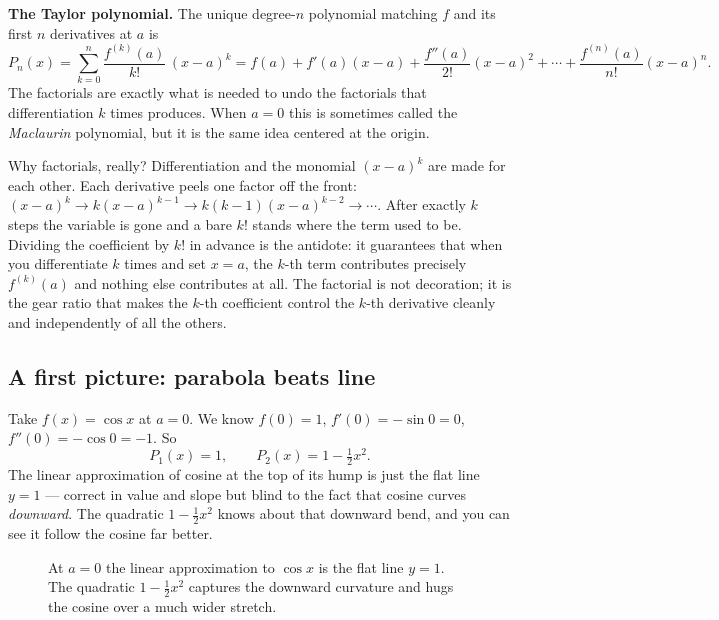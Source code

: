 \begin{focusbox}
\textbf{The Taylor polynomial.} The unique degree-$n$ polynomial matching $f$ and its
first $n$ derivatives at $a$ is
\[
  P_n(x) = \sum_{k=0}^{n} \frac{f^{(k)}(a)}{k!}\,(x-a)^k
  = f(a) + f'(a)(x-a) + \frac{f''(a)}{2!}(x-a)^2 + \cdots + \frac{f^{(n)}(a)}{n!}(x-a)^n.
\]
The factorials are exactly what is needed to undo the factorials that
differentiation $k$ times produces. When $a=0$ this is sometimes called the
\emph{Maclaurin} polynomial, but it is the same idea centered at the origin.
\end{focusbox}

\begin{whybox}
Why factorials, really? Differentiation and the monomial $(x-a)^k$ are made for each
other. Each derivative peels one factor off the front: $(x-a)^k \to k(x-a)^{k-1} \to
k(k-1)(x-a)^{k-2} \to \cdots$. After exactly $k$ steps the variable is gone and a
bare $k!$ stands where the term used to be. Dividing the coefficient by $k!$ in
advance is the antidote: it guarantees that when you differentiate $k$ times and set
$x=a$, the $k$-th term contributes precisely $f^{(k)}(a)$ and nothing else
contributes at all. The factorial is not decoration; it is the gear ratio that makes
the $k$-th coefficient control the $k$-th derivative cleanly and independently of all
the others.
\end{whybox}

\subsection{A first picture: parabola beats line}

Take $f(x) = \cos x$ at $a = 0$. We know $f(0)=1$, $f'(0) = -\sin 0 = 0$,
$f''(0) = -\cos 0 = -1$. So
\[
  P_1(x) = 1, \qquad P_2(x) = 1 - \tfrac{1}{2}x^2.
\]
The linear approximation of cosine at the top of its hump is just the flat line
$y=1$ --- correct in value and slope but blind to the fact that cosine curves
\emph{downward}. The quadratic $1 - \tfrac{1}{2}x^2$ knows about that downward bend,
and you can see it follow the cosine far better.

\begin{figure}[H]
\centering
{}
\caption{At $a=0$ the linear approximation to $\cos x$ is the flat line $y=1$. The
quadratic $1-\tfrac12 x^2$ captures the downward curvature and hugs the cosine over
a much wider stretch.}
\label{ch31:fig-cos-parabola}
\end{figure}

